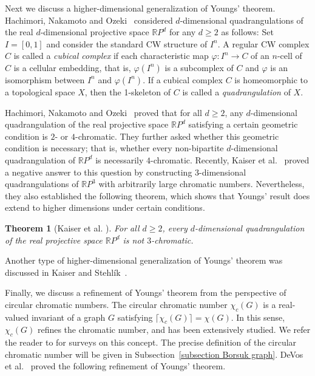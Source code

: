 \documentclass[11pt, amsfonts]{amsart}
\numberwithin{equation}{section}
\newtheorem{theorem}[thm]{Theorem}
\theoremstyle{definition}
\theoremstyle{remark}
\newcommand{\RR}{\mathbb{R}}
\begin{document}
Next we discuss a higher-dimensional generalization of Youngs' theorem.
Hachimori, Nakamoto and Ozeki~\cite{HNO} considered $d$-dimensional quadrangulations of the real $d$-dimensional projective space $\RR P^d$ for any $d\geq 2$ as follows:
Set $I = [0,1]$ and consider the standard CW structure of $I^n$.
A regular CW complex $C$ is called a \emph{cubical complex} if each characteristic map $\varphi \colon I^n \to C$ of an $n$-cell of $C$ is a cellular embedding, that is, $\varphi(I^n)$ is a subcomplex of $C$ and $\varphi$ is an isomorphism between $I^n$ and $\varphi(I^n)$.
If a cubical complex $C$ is homeomorphic to a topological space $X$, then the 1-skeleton of $C$ is called a \emph{quadrangulation} of $X$.

Hachimori, Nakamoto and Ozeki~\cite{HNO} proved that for all $d \geq 2$, any $d$-dimensional quadrangulation of the real projective space $\RR P^d$ satisfying a certain geometric condition is $2$- or $4$-chromatic. They further asked whether this geometric condition is necessary; that is, whether every non-bipartite $d$-dimensional quadrangulation of $\RR P^d$ is necessarily $4$-chromatic. Recently, Kaiser et al.~\cite{Kaiseretal} proved a negative answer to this question by constructing $3$-dimensional quadrangulations of $\RR P^3$ with arbitrarily large chromatic numbers. Nevertheless, they also established the following theorem, which shows that Youngs’ result does extend to higher dimensions under certain conditions.

\begin{theorem}[{Kaiser et al. \cite{Kaiseretal}}]\label{theorem:high-dim}
For all $d\geq 2$, every $d$-dimensional quadrangulation of the real projective space $\RR P^d$ is not $3$-chromatic.
\end{theorem}

Another type of higher-dimensional generalization of Youngs' theorem was discussed in Kaiser and Stehl\'{i}k~\cite{KS}.

Finally, we discuss a refinement of Youngs' theorem from the perspective of circular chromatic numbers. The circular chromatic number $\chi_c(G)$ is a real-valued invariant of a graph $G$ satisfying $\lceil \chi_c(G) \rceil = \chi(G)$. In this sense, $\chi_c(G)$ refines the chromatic number, and has been extensively studied. We refer the reader to \cite{PW, Zhu, Zhu2} for surveys on this concept.
The precise definition of the circular chromatic number will be given in Subsection~\ref{subsection Borsuk graph}.
DeVos et al.~\cite{DGMVZ} proved the following refinement of Youngs' theorem.
\end{document}
